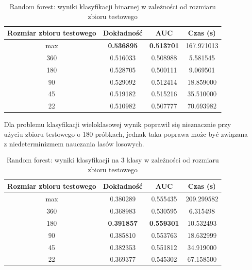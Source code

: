 \documentclass[a4paper, twoside, 11pt, openright]{article}
\begin{document}
\begin{table}[H]
    \centering
    \begin{tabular}{|c|c|c|c|}
    \hline
        \textbf{Rozmiar zbioru testowego} & \textbf{Dokładność} & \textbf{AUC} & \textbf{Czas (s)} \\ \hline
max                         & \textbf{0.536895} &  \textbf{0.513701} &  167.971013 \\ \hline
360                         &  0.516033 &  0.508988 &    5.581545 \\ \hline
180                         &  0.528705 &  0.500111 &    9.069501 \\ \hline
90                          &  0.529092 &  0.512414 &   18.859000 \\ \hline
45                          &  0.519182 &  0.515216 &   35.510000 \\ \hline
22                          &  0.510982 &  0.507777 &   70.693982 \\ \hline

    \end{tabular}
    \caption{Random forest: wyniki klasyfikacji binarnej w zależności od rozmiaru zbioru testowego}
    \label{tab:rf_walk_forward_binary}
\end{table}

Dla problemu klasyfikacji wieloklasowej wynik poprawił się nieznacznie przy użyciu zbioru testowego o 180 próbkach, jednak taka poprawa może być związana z niedeterminizmem nauczania lasów losowych.

\begin{table}[H]
    \centering
    \begin{tabular}{|c|c|c|c|}
    \hline
        \textbf{Rozmiar zbioru testowego} & \textbf{Dokładność} & \textbf{AUC} & \textbf{Czas (s)} \\ \hline
max                         &   0.380289 &  0.555435 &  209.299582 \\ \hline
360                         &  0.368983 &  0.530595 &    6.315498 \\ \hline
180                         &  \textbf{0.391857} &  \textbf{0.559301} &   10.532493 \\ \hline
90                          &  0.385810 &  0.553763 &   18.632999 \\ \hline
45                          &  0.382353 &  0.551812 &   34.919000 \\ \hline
22                          &  0.369377 &  0.545302 &   67.158500 \\ \hline
    \end{tabular}
    \caption{Random forest: wyniki klasyfikacji na 3 klasy w zależności od rozmiaru zbioru testowego}
    \label{tab:rf_walk_forward_discrete}
\end{table}
\end{document}
